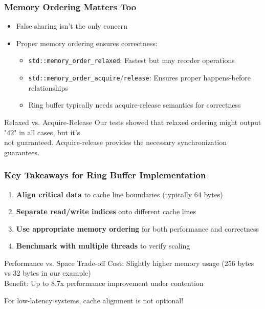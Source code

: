 \documentclass{beamer}
\begin{document}
\begin{frame}
  \frametitle{Memory Ordering Matters Too}
  
  \begin{itemize}
    \item False sharing isn't the only concern
    \item Proper memory ordering ensures correctness:
    \begin{itemize}
      \item \texttt{std::memory\_order\_relaxed}: Fastest but may reorder operations
      \item \texttt{std::memory\_order\_acquire}/\texttt{release}: Ensures proper happens-before relationships
      \item Ring buffer typically needs acquire-release semantics for correctness
    \end{itemize}
  \end{itemize}
  
  \begin{exampleblock}{Relaxed vs. Acquire-Release}
    Our tests showed that relaxed ordering might output "42" in all cases, but it's \\
    not guaranteed. Acquire-release provides the necessary synchronization guarantees.
  \end{exampleblock}
\end{frame}

\begin{frame}
  \frametitle{Key Takeaways for Ring Buffer Implementation}
  
  \begin{enumerate}
    \item \textbf{Align critical data} to cache line boundaries (typically 64 bytes)
    \item \textbf{Separate read/write indices} onto different cache lines
    \item \textbf{Use appropriate memory ordering} for both performance and correctness
    \item \textbf{Benchmark with multiple threads} to verify scaling
  \end{enumerate}
  
  \begin{alertblock}{Performance vs. Space Trade-off}
    Cost: Slightly higher memory usage (256 bytes vs 32 bytes in our example)\\
    Benefit: Up to 8.7x performance improvement under contention
  \end{alertblock}
  
  \begin{center}
    \large{For low-latency systems, cache alignment is not optional!}
  \end{center}
\end{frame}
\end{document}
